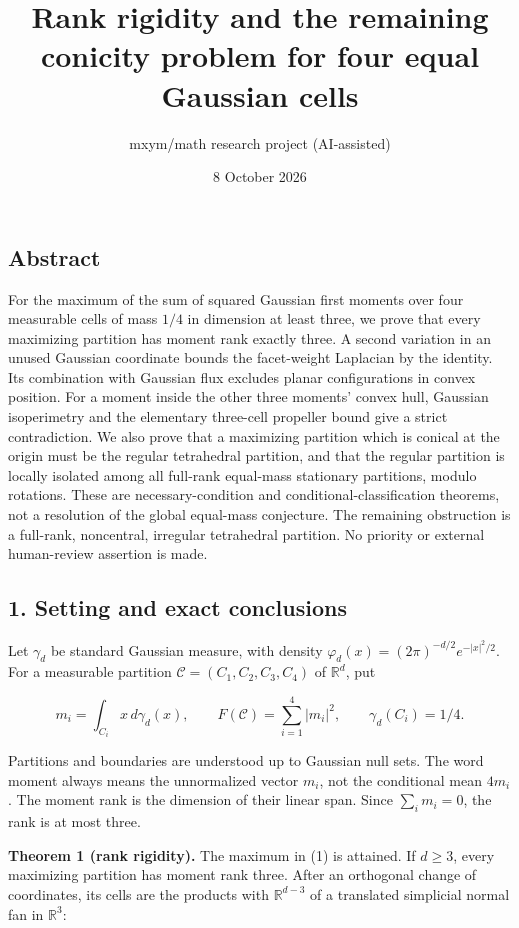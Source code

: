 \documentclass[
  11pt,
]{article}
\title{Rank rigidity and the remaining conicity problem for four equal
Gaussian cells}
\author{mxym/math research project (AI-assisted)}
\date{8 October 2026}
\begin{document}
\maketitle

\subsection{Abstract}\label{abstract}

For the maximum of the sum of squared Gaussian first moments over four
measurable cells of mass \(1/4\) in dimension at least three, we prove
that every maximizing partition has moment rank exactly three. A second
variation in an unused Gaussian coordinate bounds the facet-weight
Laplacian by the identity. Its combination with Gaussian flux excludes
planar configurations in convex position. For a moment inside the other
three moments' convex hull, Gaussian isoperimetry and the elementary
three-cell propeller bound give a strict contradiction. We also prove
that a maximizing partition which is conical at the origin must be the
regular tetrahedral partition, and that the regular partition is locally
isolated among all full-rank equal-mass stationary partitions, modulo
rotations. These are necessary-condition and conditional-classification
theorems, not a resolution of the global equal-mass conjecture. The
remaining obstruction is a full-rank, noncentral, irregular tetrahedral
partition. No priority or external human-review assertion is made.

\subsection{1. Setting and exact
conclusions}\label{setting-and-exact-conclusions}

Let \(\gamma_d\) be standard Gaussian measure, with density
\(\varphi_d(x)=(2\pi)^{-d/2}e^{-|x|^2/2}\). For a measurable partition
\(\mathcal C=(C_1,C_2,C_3,C_4)\) of \(\mathbb R^d\), put

\[
 m_i=\int_{C_i}x\,d\gamma_d(x),\qquad
 F(\mathcal C)=\sum_{i=1}^4|m_i|^2,\qquad
 \gamma_d(C_i)=1/4.                                      \tag{1}
\]

Partitions and boundaries are understood up to Gaussian null sets. The
word moment always means the unnormalized vector \(m_i\), not the
conditional mean \(4m_i\). The moment rank is the dimension of their
linear span. Since \(\sum_i m_i=0\), the rank is at most three.

\textbf{Theorem 1 (rank rigidity).} The maximum in (1) is attained. If
\(d\ge3\), every maximizing partition has moment rank three. After an
orthogonal change of coordinates, its cells are the products with
\(\mathbb R^{d-3}\) of a translated simplicial normal fan in
\(\mathbb R^3\):
\end{document}

